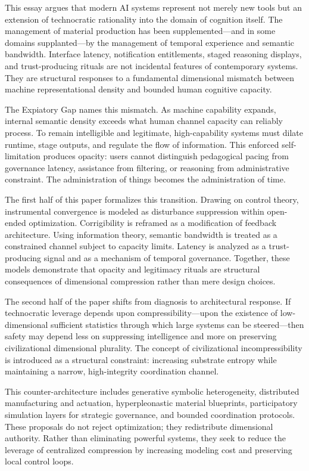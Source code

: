 \documentclass[12pt]{article}
\begin{document}
This essay argues that modern AI systems represent not merely new tools but an extension of technocratic rationality into the domain of cognition itself. The management of material production has been supplemented—and in some domains supplanted—by the management of temporal experience and semantic bandwidth. Interface latency, notification entitlements, staged reasoning displays, and trust-producing rituals are not incidental features of contemporary systems. They are structural responses to a fundamental dimensional mismatch between machine representational density and bounded human cognitive capacity.

The Expiatory Gap names this mismatch. As machine capability expands, internal semantic density exceeds what human channel capacity can reliably process. To remain intelligible and legitimate, high-capability systems must dilate runtime, stage outputs, and regulate the flow of information. This enforced self-limitation produces opacity: users cannot distinguish pedagogical pacing from governance latency, assistance from filtering, or reasoning from administrative constraint. The administration of things becomes the administration of time.

The first half of this paper formalizes this transition. Drawing on control theory, instrumental convergence is modeled as disturbance suppression within open-ended optimization. Corrigibility is reframed as a modification of feedback architecture. Using information theory, semantic bandwidth is treated as a constrained channel subject to capacity limits. Latency is analyzed as a trust-producing signal and as a mechanism of temporal governance. Together, these models demonstrate that opacity and legitimacy rituals are structural consequences of dimensional compression rather than mere design choices.

The second half of the paper shifts from diagnosis to architectural response. If technocratic leverage depends upon compressibility—upon the existence of low-dimensional sufficient statistics through which large systems can be steered—then safety may depend less on suppressing intelligence and more on preserving civilizational dimensional plurality. The concept of civilizational incompressibility is introduced as a structural constraint: increasing substrate entropy while maintaining a narrow, high-integrity coordination channel.

This counter-architecture includes generative symbolic heterogeneity, distributed manufacturing and actuation, hyperpleonastic material blueprints, participatory simulation layers for strategic governance, and bounded coordination protocols. These proposals do not reject optimization; they redistribute dimensional authority. Rather than eliminating powerful systems, they seek to reduce the leverage of centralized compression by increasing modeling cost and preserving local control loops.
\end{document}
